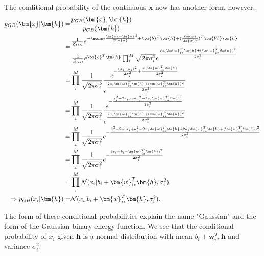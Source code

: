 The conditional probability of the continuous $\bm{x}$ now has another form, however.
\begin{align}
	p_{GB} (\bm{x}|\bm{h})
	=& \frac{p_{GB} (\bm{x}, \bm{h})}{p_{GB} (\bm{h})} \nonumber \\
	=& \frac{\frac{1}{Z_{GB}} e^{-\norm*{\frac{\bm{x} -\bm{a}}{2\bm{\sigma}}}^2 + \bm{b}^T \bm{h} 
	+ (\frac{\bm{x}}{\bm{\sigma}^2})^T \bm{W}\bm{h}}}
	{\frac{1}{Z_{GB}} e^{\bm{b}^T \bm{h}} \prod_i^M
	\sqrt{2\pi \sigma_i^2}
	e^{\frac{2a_i \bm{w}_{i\ast}^T \bm{h} +(\bm{w}_{i\ast}^T \bm{h})^2 }{2\sigma_i^2}}}
	\nonumber \\
	=& \prod_i^M \frac{1}{\sqrt{2\pi \sigma_i^2}}
	\frac{e^{- \frac{(x_i - a_i)^2}{2\sigma_i^2} + \frac{x_i \bm{w}_{i\ast}^T \bm{h}}{2\sigma_i^2} }}
	{e^{\frac{2a_i \bm{w}_{i\ast}^T \bm{h} +(\bm{w}_{i\ast}^T \bm{h})^2 }{2\sigma_i^2}}}
	\nonumber \\
	=& \prod_i^M \frac{1}{\sqrt{2\pi \sigma_i^2}}
	\frac{e^{-\frac{x_i^2 - 2a_i x_i + a_i^2 - 2x_i \bm{w}_{i\ast}^T\bm{h} }{2\sigma_i^2} } }
	{e^{\frac{2a_i \bm{w}_{i\ast}^T \bm{h} +(\bm{w}_{i\ast}^T \bm{h})^2 }{2\sigma_i^2}}}
	\nonumber \\
	=& \prod_i^M \frac{1}{\sqrt{2\pi \sigma_i^2}}
	e^{- \frac{x_i^2 - 2a_i x_i + a_i^2 - 2x_i \bm{w}_{i\ast}^T\bm{h}
	+ 2a_i \bm{w}_{i\ast}^T \bm{h} +(\bm{w}_{i\ast}^T \bm{h})^2}
	{2\sigma_i^2} }
	\nonumber \\
	=& \prod_i^M \frac{1}{\sqrt{2\pi \sigma_i^2}}
	e^{ - \frac{(x_i - b_i - \bm{w}_{i\ast}^T \bm{h})^2}{2\sigma_i^2}} \nonumber \\
	=& \prod_i^M \mathcal{N}
	(x_i | b_i + \bm{w}_{i\ast}^T \bm{h}, \sigma_i^2) \\
	\Rightarrow p_{GB} (x_i|\bm{h}) =& \mathcal{N}
	(x_i | b_i + \bm{w}_{i\ast}^T \bm{h}, \sigma_i^2) .
\end{align}

The form of these conditional probabilities explain the name "Gaussian" and the form of the Gaussian-binary energy function. We see that the conditional probability of $x_i$ given $\bm{h}$ is a normal distribution with mean $b_i + \bm{w}_{i\ast}^T \bm{h}$ and variance $\sigma_i^2$.

